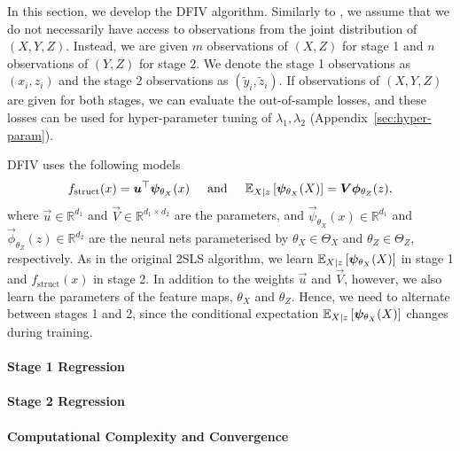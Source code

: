 
In this section, we develop the DFIV algorithm. Similarly to \citet{Singh2019}, we assume that we do not necessarily have  access to observations from the joint distribution of $(X,Y,Z)$. Instead, we are given $m$ observations of $(X,Z)$ for stage 1 and $n$ observations of $(Y,Z)$ for stage 2. We denote the stage 1 observations as $(x_i, z_i)$ and the stage 2 observations as $(\tilde y_i, \tilde z_i)$. If observations of $(X,Y,Z)$ are given for both stages, we can evaluate the out-of-sample losses, and these losses can be used for hyper-parameter tuning of $\lambda_1,\lambda_2$ (Appendix~\ref{sec:hyper-param}).

DFIV uses the following models
\begin{align}
f_\mathrm{struct}(x) = \vec{u}^\top \vec{\psi}_{\theta_X}(x) \hspace{.5cm} \mathrm{and} \hspace{.5cm} \expect[X|z]{\vec{\psi}_{\theta_X}(X)} = \vec{V}\vec{\phi}_{\theta_Z}(z),
\end{align}
where $\vec{u} \in \mathbb{R}^{d_1}$ and $\vec{V} \in \mathbb{R}^{d_1\times d_2}$ are the parameters, and $\vec{\psi}_{\theta_X}(x) \in \mathbb{R}^{d_1}$ and $\vec{\phi}_{\theta_Z}(z)\in \mathbb{R}^{d_2}$ are the neural nets parameterised by $\theta_X \in \Theta_X$ and $\theta_Z \in \Theta_Z$, respectively. As in the original 2SLS algorithm, we learn $\expect[X|z]{\vec{\psi}_{\theta_X}(X)}$ in stage 1 and $f_\mathrm{struct}(x)$ in stage 2. In addition to the weights $\vec{u}$ and $\vec{V}$, however, we also learn the parameters of the feature maps, $\theta_X$ and $\theta_Z$. Hence, we need to alternate between stages 1 and 2, since the conditional expectation $\expect[X|z]{\vec{\psi}_{\theta_X}(X)}$ changes during training.

\paragraph{Stage 1 Regression}

\paragraph{Stage 2 Regression}

\paragraph{Computational Complexity and Convergence}




